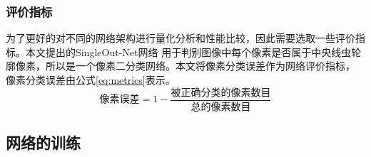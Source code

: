 \subsubsection{评价指标}
	为了更好的对不同的网络架构进行量化分析和性能比较，因此需要选取一些评价指标。本文提出的SingleOut-Net网络
	用于判别图像中每个像素是否属于中央线虫轮廓像素，所以是一个像素二分类网络。本文将像素分类误差作为网络评价指标，
	像素分类误差由公式\ref{eq:metrics}表示。
	\begin{equation}
		\text{像素误差} =1- \frac{\text{被正确分类的像素数目}}{\text{总的像素数目}} \label{eq:metrics}
	\end{equation}
\subsection{网络的训练}
	
